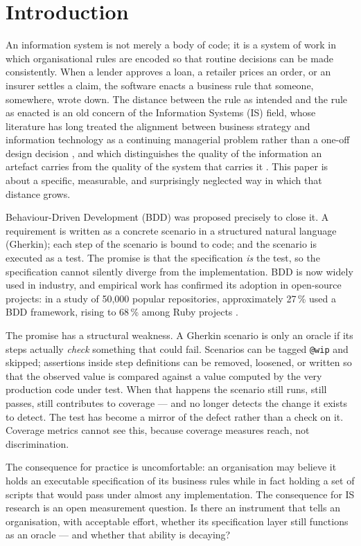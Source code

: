 \section{Introduction}
\label{sec:intro}

An information system is not merely a body of code; it is a system of work in which organisational
rules are encoded so that routine decisions can be made consistently. When a lender approves a loan, a retailer prices an order, or an insurer settles a claim, the software enacts a business rule that someone, somewhere, wrote down. The distance between the rule as intended and the rule as enacted is
an old concern of the Information Systems (IS) field, whose literature has long treated the alignment
between business strategy and information technology as a continuing managerial problem rather than a
one-off design decision \citep{henderson1993strategic}, and which distinguishes the quality of the
information an artefact carries from the quality of the system that carries it
\citep{delone2003model}. This paper is about a specific, measurable, and surprisingly neglected way in
which that distance grows.

Behaviour-Driven Development (BDD) was proposed precisely to close it. A requirement is written as a
concrete scenario in a structured natural language (Gherkin); each step of the scenario is bound to
code; and the scenario is executed as a test. The promise is that the specification \emph{is} the
test, so the specification cannot silently diverge from the implementation. BDD is now widely used in
industry, and empirical work has confirmed its adoption in open-source projects: in a study of
50{,}000 popular repositories, approximately 27\,\% used a BDD framework, rising to 68\,\% among Ruby
projects \citep{zampetti2020demystifying}.

The promise has a structural weakness. A Gherkin scenario is only an oracle if its steps actually
\emph{check} something that could fail. Scenarios can be tagged \texttt{@wip} and skipped; assertions
inside step definitions can be removed, loosened, or written so that the observed value is compared
against a value computed by the very production code under test. When that happens the scenario still
runs, still passes, still contributes to coverage --- and no longer detects the change it exists to
detect. The test has become a mirror of the defect rather than a check on it. Coverage metrics cannot
see this, because coverage measures reach, not discrimination.

The consequence for practice is uncomfortable: an organisation may believe it holds an executable
specification of its business rules while in fact holding a set of scripts that would pass under
almost any implementation. The consequence for IS research is an open measurement question. Is there
an instrument that tells an organisation, with acceptable effort, whether its specification layer
still functions as an oracle --- and whether that ability is decaying?

